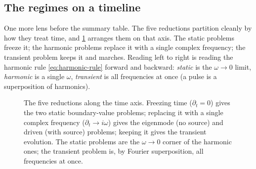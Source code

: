 \subsection{The regimes on a timeline}

One more lens before the summary table. The five reductions partition cleanly by
how they treat time, and \cref{fig:timeline} arranges them on that axis. The
static problems freeze it; the harmonic problems replace it with a single complex
frequency; the transient problem keeps it and marches. Reading left to right is
reading the harmonic rule \cref{eq:harmonic-rule} forward and backward:
\emph{static} is the $\omega\to 0$ limit, \emph{harmonic} is a single $\omega$,
\emph{transient} is all frequencies at once (a pulse is a superposition of
harmonics).

\begin{figure}[t]
\centering
{}
\caption[The reductions arranged by regime]{The five reductions along the
time axis. Freezing time ($\partial_t=0$) gives the two static boundary-value
problems; replacing it with a single complex frequency ($\partial_t\to i\omega$)
gives the eigenmode (no source) and driven (with source) problems; keeping it
gives the transient evolution. The static problems are the $\omega\to0$ corner of
the harmonic ones; the transient problem is, by Fourier superposition, all
frequencies at once.}
\label{fig:timeline}
\end{figure}

